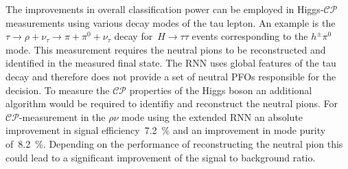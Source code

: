 The improvements in overall classification power can be employed in
Higgs-$\mathcal{CP}$ measurements using various decay modes of the tau lepton.
An example is the~$\tau \to \rho + \nu_\tau \to \pi + \pi^0 + \nu_\tau$ decay
for~$H \to \tau\tau$ events corresponding to the $h^\pm \pi^0$ mode. This
measurement requires the neutral pions to be reconstructed and identified in the
measured final state. The RNN uses global features of the tau decay and
therefore does not provide a set of neutral PFOs responsible for the decision.
To measure the $\mathcal{CP}$ properties of the Higgs boson an additional
algorithm would be required to identifiy and reconstruct the neutral pions. For
$\mathcal{CP}$-measurement in the $\rho\nu$ mode using the extended RNN an
absolute improvement in signal efficiency~\SI{7.2}{\percent} and an improvement
in mode purity of~\SI{8.2}{\percent}. Depending on the performance of
reconstructing the neutral pion this could lead to a significant improvement of
the signal to background ratio.



\clearpage

